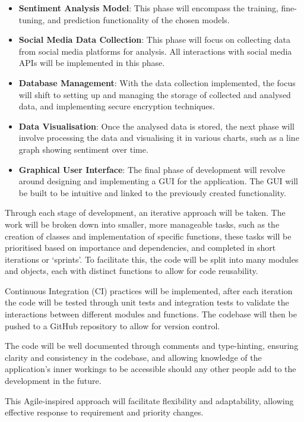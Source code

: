 \begin{itemize}
    \item \textbf{Sentiment Analysis Model}: This phase will encompass the training, fine-tuning, and prediction functionality of the chosen models.
    \item \textbf{Social Media Data Collection}: This phase will focus on collecting data from social media platforms for analysis. All interactions with social media APIs will be implemented in this phase.
    \item \textbf{Database Management}: With the data collection implemented, the focus will shift to setting up and managing the storage of collected and analysed data, and implementing secure encryption techniques.
    \item \textbf{Data Visualisation}: Once the analysed data is stored, the next phase will involve processing the data and visualising it in various charts, such as a line graph showing sentiment over time.
    \item \textbf{Graphical User Interface}: The final phase of development will revolve around designing and implementing a GUI for the application. The GUI will be built to be intuitive and linked to the previously created functionality.
\end{itemize}

Through each stage of development, an iterative approach will be taken. The work will be broken down into smaller, more manageable tasks, such as the creation of classes and implementation of specific functions, these tasks will be prioritised based on importance and dependencies, and completed in short iterations or `sprints'. To facilitate this, the code will be split into many modules and objects, each with distinct functions to allow for code reusability.

Continuous Integration (CI) practices will be implemented, after each iteration the code will be tested through unit tests and integration tests to validate the interactions between different modules and functions. The codebase will then be pushed to a GitHub repository to allow for version control.

The code will be well documented through comments and type-hinting, ensuring clarity and consistency in the codebase, and allowing knowledge of the application's inner workings to be accessible should any other people add to the development in the future.

This Agile-inspired approach will facilitate flexibility and adaptability, allowing effective response to requirement and priority changes.

